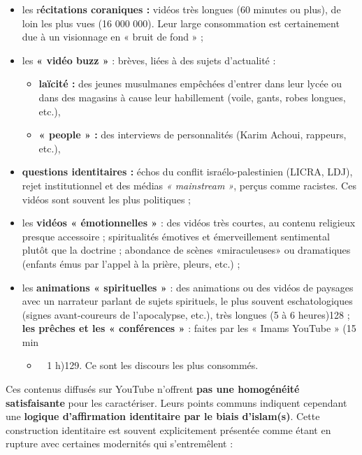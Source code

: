 \begin{itemize}
\item
  les r\textbf{écitations coraniques :} vidéos très longues (60 minutes
  ou plus), de loin les plus vues (16 000 000). Leur large consommation
  est certainement due à un visionnage en « bruit de fond » ;
\item
  les \textbf{« vidéo buzz »} : brèves, liées à des sujets d'actualité :

  \begin{itemize}
  \item
    \textbf{laïcité :} des jeunes musulmanes empêchées d'entrer dans
    leur lycée ou dans des magasins à cause leur habillement (voile,
    gants, robes longues, etc.),
  \item
    \textbf{« people » :} des interviews de personnalités (Karim Achoui,
    rappeurs, etc.),
  \end{itemize}
\item
  \textbf{questions identitaires :} échos du conflit israélo-palestinien
  (LICRA, LDJ), rejet institutionnel et des médias \emph{« mainstream
  »}, perçus comme racistes. Ces vidéos sont souvent les plus politiques
  ;
\item
  les \textbf{vidéos « émotionnelles »} : des vidéos très courtes, au
  contenu religieux presque accessoire ; spiritualités émotives et
  émerveillement sentimental plutôt que la doctrine ; abondance de
  scènes «miraculeuses» ou dramatiques (enfants émus par l'appel à la
  prière, pleurs, etc.) ;
\item
  les \textbf{animations « spirituelles »} : des animations ou des
  vidéos de paysages avec un narrateur parlant de sujets spirituels, le
  plus souvent eschatologiques (signes avant-coureurs de l'apocalypse,
  etc.), très longues (5 à 6 heures)128 ; \textbf{les prêches et les «
  conférences »} : faites par les « Imams YouTube » (15 min

  \begin{itemize}
  \item ~
    1 h)129. Ce sont les discours les plus consommés.
  \end{itemize}
\end{itemize}


Ces contenus diffusés sur YouTube n'offrent \textbf{pas une homogénéité
satisfaisante} pour les caractériser. Leurs points communs indiquent
cependant une \textbf{logique d'affirmation identitaire par le biais
d'islam(s)}. Cette construction identitaire est souvent explicitement
présentée comme étant en rupture avec certaines modernités qui
s'entremêlent :


